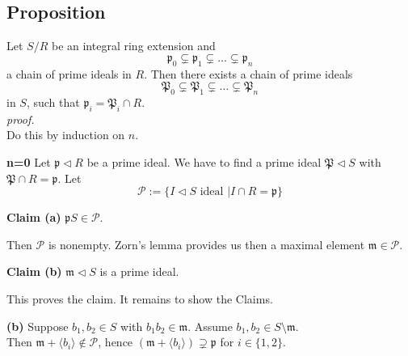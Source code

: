 \documentclass[12pt]{book}
\begin{document}
\begin{spacing}{1.3}
\subsection{Proposition} %
\titleformat{\subsection}{\normalfont\normalsize\bfseries}{}{0em}{#1 \thesubsection}
Let $S/R$ be an integral ring extension and
$$\mathfrak{p}_0 \subsetneq \mathfrak{p}_1 \subsetneq \ldots \subsetneq \mathfrak{p}_n$$
a chain of prime ideals in $R$. Then there exists a chain of prime ideals
$$\mathfrak{P}_0 \subsetneq \mathfrak{P}_1 \subsetneq \ldots \subsetneq \mathfrak{P}_n$$
in $S$, such that $\mathfrak{p}_i = \mathfrak{P}_i \cap R$.\\
\textit{proof.}\\
Do this by induction on $n$. 
\begin{compactitem}
\item[\textbf{n=0}] Let $\mathfrak{p} \triangleleft R$ be a prime ideal. We have to find a prime ideal $\mathfrak{P} \triangleleft S$ with $\mathfrak{P} \cap R=\mathfrak{p}$. Let
$$\mathcal{P}:= \{I \triangleleft S \textrm{ ideal } \big \vert I \cap R = \mathfrak{p} \}$$
\begin{compactenum}
\item[\textbf{Claim (a)}] $\mathfrak{p}S \in \mathcal{P}$.
\end{compactenum}
Then $\mathcal{P}$ is nonempty. Zorn's lemma provides us then a maximal element $\mathfrak{m} \in \mathcal{P}$.
\begin{compactenum}
\item[\textbf{Claim (b)}] $\mathfrak{m} \triangleleft S$ is a prime ideal.
\end{compactenum}
This proves the claim. It remains to show the Claims.
\begin{compactenum}
\item[\textbf{(b)}] Suppose $b_1, b_2 \in S$ with $b_1b_2 \in \mathfrak{m}$. Assume $b_1, b_2 \in S\setminus \mathfrak{m}$.\\
Then $\mathfrak{m}+\langle b_i \rangle \notin \mathcal{P}$, hence $\left(\mathfrak{m}+\langle b_i \rangle \right) \supsetneq \mathfrak{p}$ for $i \in \{1,2\}$.

\end{compactenum}
\end{compactitem}
\end{spacing}
\end{document}

